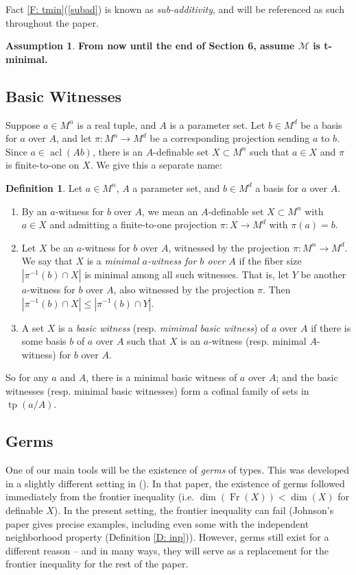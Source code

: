 \documentclass{amsart}
\theoremstyle{definition}
\newtheorem{definition}[theorem]{Definition}
\newtheorem{assumption}[theorem]{Assumption}
\newcommand{\acl}{\operatorname{acl}}
\newcommand{\tp}{\operatorname{tp}}
\begin{document}
Fact \ref{F: tmin}(\ref{subad}) is known as \textit{sub-additivity}, and will be referenced as such throughout the paper.

\begin{assumption} \textbf{From now until the end of Section 6, assume $\mathcal M$ is t-minimal.}
\end{assumption}

\subsection{Basic Witnesses}

Suppose $a\in M^n$ is a real tuple, and $A$ is a parameter set. Let $b\in M^d$ be a basis for $a$ over $A$, and let $\pi:M^n\rightarrow M^d$ be a corresponding projection sending $a$ to $b$. Since $a\in\acl(Ab)$, there is an $A$-definable set $X\subset M^n$ such that $a\in X$ and $\pi$ is finite-to-one on $X$. We give this a separate name:
\begin{definition}
    Let $a\in M^n$, $A$ a parameter set, and $b\in M^d$ a basis for $a$ over $A$.
    \begin{enumerate}
        \item By an $a$-witness for $b$ over $A$, we mean an $A$-definable set $X\subset M^n$ with $a\in X$ and admitting a finite-to-one projection $\pi:X\rightarrow M^d$ with $\pi(a)=b$.
        \item Let $X$ be an $a$-witness for $b$ over $A$, witnessed by the projection $\pi:M^n\rightarrow M^d$. We say that $X$ is a \textit{minimal $a$-witness for $b$ over $A$} if the fiber size $|\pi^{-1}(b)\cap X|$ is minimal among all such witnesses. That is, let $Y$ be another $a$-witness for $b$ over $A$, also witnessed by the projection $\pi$. Then $|\pi^{-1}(b)\cap X|\leq|\pi^{-1}(b)\cap Y|$.
        \item A set $X$ is a \textit{basic witness} (resp. \textit{mimimal basic witness}) of $a$ over $A$ if there is some basis $b$ of $a$ over $A$ such that $X$ is an $a$-witness (resp. minimal $A$-witness) for $b$ over $A$.
    \end{enumerate}
\end{definition}

So for any $a$ and $A$, there is a minimal basic witness of $a$ over $A$; and the basic witnesses (resp. minimal basic witnesses) form a cofinal family of sets in $\tp(a/A)$.

\subsection{Germs} One of our main tools will be the existence of \textit{germs} of types. This was developed in a slightly different setting in (\cite[\S 3.2]{CasHasYe}). In that paper, the existence of germs followed immediately from the frontier inequality (i.e. $\dim(\operatorname{Fr}(X))<\dim(X)$ for definable $X$). In the present setting, the frontier inequality can fail (Johnson's paper gives precise examples, including even some with the independent neighborhood property (Definition \ref{D: inp})). However, germs still exist for a different reason -- and in many ways, they will serve as a replacement for the frontier inequality for the rest of the paper. 
\end{document}
